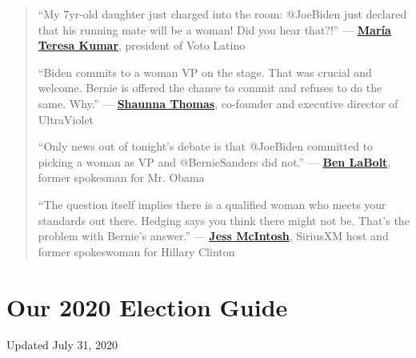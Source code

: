 \begin{quote}
``My 7yr-old daughter just charged into the room: @JoeBiden just
declared that his running mate will be a woman! Did you hear that?!''
---
\textbf{\href{https://twitter.com/MariaTeresa1/status/1239358896071942144}{María
Teresa Kumar}}, president of Voto Latino

``Biden commits to a woman VP on the stage. That was crucial and
welcome. Bernie is offered the chance to commit and refuses to do the
same. Why.'' ---
\textbf{\href{https://twitter.com/SLThomas/status/1239358370299117569}{Shaunna
Thomas}}, co-founder and executive director of UltraViolet

``Only news out of tonight's debate is that @JoeBiden committed to
picking a woman as VP and @BernieSanders did not.'' ---
\textbf{\href{https://twitter.com/BenLaBolt/status/1239359314701086721}{Ben
LaBolt}}, former spokesman for Mr. Obama

``The question itself implies there is a qualified woman who meets your
standards out there. Hedging says you think there might not be. That's
the problem with Bernie's answer.'' ---
\textbf{\href{https://twitter.com/jess_mc/status/1239362402887630848}{Jess
McIntosh}}, SiriusXM host and former spokeswoman for Hillary Clinton
\end{quote}

\hypertarget{our-2020-election-guide}{%
\section{Our 2020 Election Guide}\label{our-2020-election-guide}}

Updated July 31, 2020

